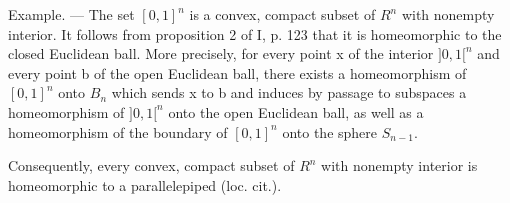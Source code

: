 Example. --- The set \([0,1]^{n}\) is a convex, compact subset of \(R^{n}\) with nonempty interior. It follows from proposition 2 of I, p. 123 that it is homeomorphic to the closed Euclidean ball. More precisely, for every point x of the interior \(]0,1[^{n}\) and every point b of the open Euclidean ball, there exists a homeomorphism of \([0,1]^{n}\) onto \(B_{n}\) which sends x to b and induces by passage to subspaces a homeomorphism of \(]0,1[^{n}\) onto the open Euclidean ball, as well as a homeomorphism of the boundary of \([0,1]^{n}\) onto the sphere \(S_{n-1}\).

Consequently, every convex, compact subset of \(R^{n}\) with nonempty interior is homeomorphic to a parallelepiped (loc. cit.).

